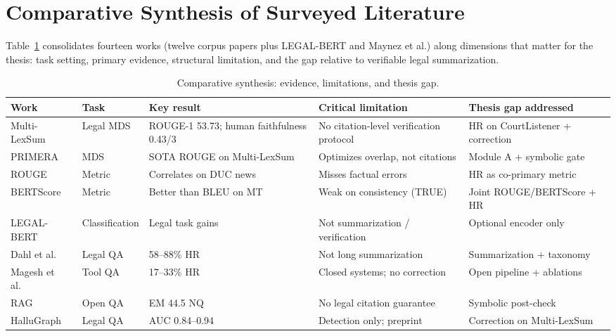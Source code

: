 \section{Comparative Synthesis of Surveyed Literature}
\label{sec:lit-synthesis}

Table~\ref{tab:lit-synthesis} consolidates fourteen works (twelve corpus papers plus LEGAL-BERT and Maynez et al.) along dimensions that matter for the thesis: task setting, primary evidence, structural limitation, and the gap relative to verifiable legal summarization.

\begin{table}[!t]
\centering
\caption{Comparative synthesis: evidence, limitations, and thesis gap.}
\label{tab:lit-synthesis}
\small
\begin{tabular}{@{}p{2.5cm}p{2.2cm}p{2.4cm}p{3.8cm}p{3.5cm}@{}}
\toprule
\textbf{Work} & \textbf{Task} & \textbf{Key result} & \textbf{Critical limitation} & \textbf{Thesis gap addressed} \\
\midrule
Multi-LexSum \cite{shen2022multilexsum} & Legal MDS & ROUGE-1 53.73; human faithfulness 0.43/3 & No citation-level verification protocol & HR on CourtListener + correction \\
PRIMERA \cite{xiao2022primera} & MDS & SOTA ROUGE on Multi-LexSum & Optimizes overlap, not citations & Module A + symbolic gate \\
ROUGE \cite{lin2004rouge} & Metric & Correlates on DUC news & Misses factual errors \cite{maynez2020faithfulness} & HR as co-primary metric \\
BERTScore \cite{zhang2020bertscore} & Metric & Better than BLEU on MT & Weak on consistency (TRUE) \cite{honovich2022true} & Joint ROUGE/BERTScore + HR \\
LEGAL-BERT \cite{chalkidis2020legalbert} & Classification & Legal task gains & Not summarization / verification & Optional encoder only \\
Dahl et al.\ \cite{dahl2024largelegalfictions} & Legal QA & 58--88\% HR & Not long summarization & Summarization + taxonomy \\
Magesh et al.\ \cite{magesh2025hallucinationfree} & Tool QA & 17--33\% HR & Closed systems; no correction & Open pipeline + ablations \\
RAG \cite{lewis2020rag} & Open QA & EM 44.5 NQ & No legal citation guarantee & Symbolic post-check \\
HalluGraph \cite{noel2025hallugraph} & Legal QA & AUC 0.84--0.94 & Detection only; preprint & Correction on Multi-LexSum \\

\end{tabular}
\end{table}
